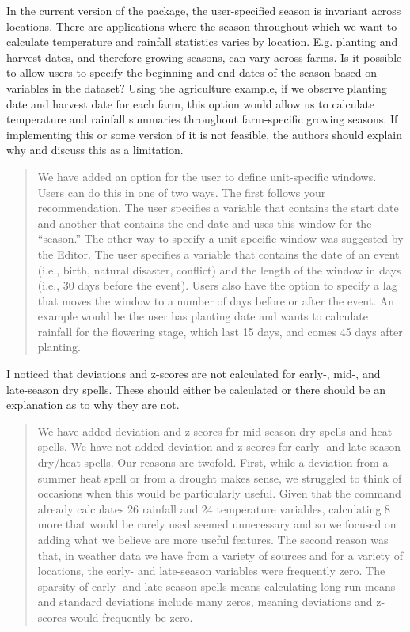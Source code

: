 \documentclass{article}[11pt]
\begin{document}
In the current version of the package, the user-specified season is invariant across locations. There are applications where the season throughout which we want to calculate temperature and rainfall statistics varies by location. E.g. planting and harvest dates, and therefore growing seasons, can vary across farms. Is it possible to allow users to specify the beginning and end dates of the season based on variables in the dataset? Using the agriculture example, if we observe planting date and harvest date for each farm, this option would allow us to calculate temperature and rainfall summaries throughout farm-specific growing seasons. If implementing this or some version of it is not feasible, the authors should explain why and discuss this as a limitation.
    \begin{quote}
        We have added an option for the user to define unit-specific windows. Users can do this in one of two ways. The first follows your recommendation. The user specifies a variable that contains the start date and another that contains the end date and uses this window for the ``season.'' The other way to specify a unit-specific window was suggested by the Editor. The user specifies a variable that contains the date of an event (i.e., birth, natural disaster, conflict) and the length of the window in days (i.e., 30 days before the event). Users also have the option to specify a lag that moves the window to a number of days before or after the event. An example would be the user has planting date and wants to calculate rainfall for the flowering stage, which last 15 days, and comes 45 days after planting.
    \end{quote}

I noticed that deviations and z-scores are not calculated for early-, mid-, and late-season dry spells. These should either be calculated or there should be an explanation as to why they are not.   
    \begin{quote}
        We have added deviation and z-scores for mid-season dry spells and heat spells. We have not added deviation and z-scores for early- and late-season dry/heat spells. Our reasons are twofold. First, while a deviation from a summer heat spell or from a drought makes sense, we struggled to think of occasions when this would be particularly useful. Given that the command already calculates 26 rainfall and 24 temperature variables, calculating 8 more that would be rarely used seemed unnecessary and so we focused on adding what we believe are more useful features. The second reason was that, in weather data we have from a variety of sources and for a variety of locations, the early- and late-season variables were frequently zero. The sparsity of early- and late-season spells means calculating long run means and standard deviations include many zeros, meaning deviations and z-scores would frequently be zero.
    \end{quote}
\end{document}
